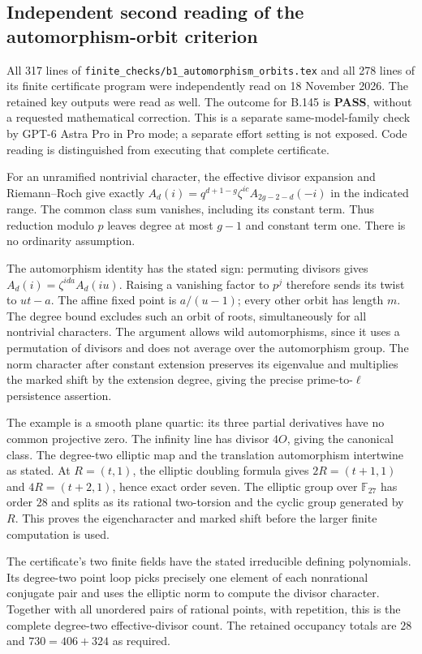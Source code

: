 \subsection*{Independent second reading of the automorphism-orbit criterion}

All 317 lines of \texttt{finite\_checks/b1\_automorphism\_orbits.tex}
and all 278 lines of its finite certificate program were
independently read on 18 November 2026.  The retained
key outputs were read as well.  The outcome for B.145
is \textbf{PASS}, without a requested mathematical
correction.  This is a separate same-model-family check
by GPT-6 Astra Pro in Pro mode; a separate effort setting
is not exposed.  Code reading is distinguished from
executing that complete certificate.

For an unramified nontrivial character, the effective
divisor expansion and Riemann--Roch give exactly
$A_d(i)=q^{d+1-g}\zeta^{ic}A_{2g-2-d}(-i)$ in the
indicated range.  The common class sum vanishes,
including its constant term.  Thus reduction modulo
$p$ leaves degree at most $g-1$ and constant term one.
There is no ordinarity assumption.

The automorphism identity has the stated sign:
permuting divisors gives
$A_d(i)=\zeta^{ida}A_d(iu)$.  Raising a vanishing
factor to $p^j$ therefore sends its twist to
$ut-a$.  The affine fixed point is $a/(u-1)$;
every other orbit has length $m$.  The degree bound
excludes such an orbit of roots, simultaneously for
all nontrivial characters.  The argument allows
wild automorphisms, since it uses a permutation of
divisors and does not average over the automorphism
group.  The norm character after constant extension
preserves its eigenvalue and multiplies the marked
shift by the extension degree, giving the precise
prime-to-$\ell$ persistence assertion.

The example is a smooth plane quartic: its three
partial derivatives have no common projective zero.
The infinity line has divisor $4O$, giving the
canonical class.  The degree-two elliptic map and
the translation automorphism intertwine as stated.
At $R=(t,1)$, the elliptic doubling formula gives
$2R=(t+1,1)$ and $4R=(t+2,1)$, hence exact order
seven.  The elliptic group over $\mathbb F_{27}$
has order $28$ and splits as its rational
two-torsion and the cyclic group generated by $R$.
This proves the eigencharacter and marked shift
before the larger finite computation is used.

The certificate's two finite fields have the stated
irreducible defining polynomials.  Its degree-two
point loop picks precisely one element of each
nonrational conjugate pair and uses the elliptic
norm to compute the divisor character.  Together
with all unordered pairs of rational points, with
repetition, this is the complete degree-two
effective-divisor count.  The retained occupancy
totals are $28$ and $730=406+324$ as required.

